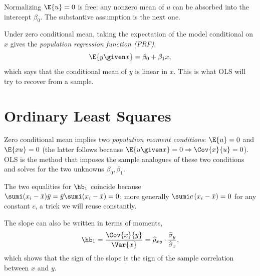 Normalizing $\E{u}=0$ is free: any nonzero mean of $u$ can be absorbed into the intercept $\beta_0$. The substantive assumption is the next one.


Under zero conditional mean, taking the expectation of the model conditional on $x$ gives the \emph{population regression function (PRF)},
\[
\E{y \given x} = \beta_0 + \beta_1 x,
\]
which says that the conditional mean of $y$ is linear in $x$. This is what OLS will try to recover from a sample.

\section{Ordinary Least Squares}

Zero conditional mean implies two \emph{population moment conditions}: $\E{u}=0$ and $\E{xu}=0$ (the latter follows because $\E{u\given x}=0 \Rightarrow \Cov{x}{u}=0$). OLS is the method that imposes the sample analogues of these two conditions and solves for the two unknowns $\beta_0,\beta_1$.


The two equalities for $\hb_1$ coincide because $\sumi (x_i-\bar x)\bar y = \bar y \sumi(x_i-\bar x) = 0$; more generally $\sumi c\,(x_i-\bar x)=0$ for any constant $c$, a trick we will reuse constantly.

The slope can also be written in terms of moments,
\[
\hb_1 = \frac{\Cov{x}{y}}{\Var{x}} = \widehat\rho_{xy}\cdot \frac{\widehat\sigma_y}{\widehat\sigma_x},
\]
which shows that the sign of the slope is the sign of the sample correlation between $x$ and $y$.


